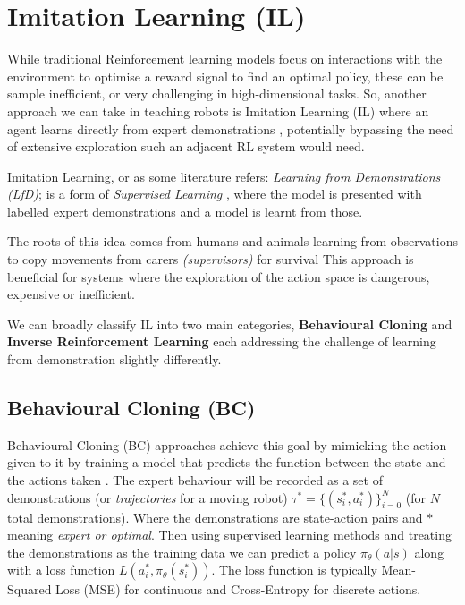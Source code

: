 \section{Imitation Learning (IL)}\label{sec:il}
  While traditional Reinforcement learning models focus on interactions with the environment to optimise a reward signal to find an optimal policy, these can be sample inefficient, or very challenging in high-dimensional tasks. So, another approach we can take in teaching robots is Imitation Learning (IL) where an agent learns directly from expert demonstrations \cite{attia2018globaloverviewimitationlearning}, potentially bypassing the need of extensive exploration such an adjacent RL system would need.

  Imitation Learning, or as some literature refers: \emph{Learning from Demonstrations (LfD)}\cite{ARGALL2009469}; is a form of \emph{Supervised Learning} \cite{hastie2009overview,cunningham2008supervised}, where the model is presented with labelled expert demonstrations and a model is learnt from those.
  
  The roots of this idea comes from humans and animals \cite{bakker1996robot} learning from observations to copy movements from carers \emph{(supervisors)} for survival This approach is beneficial for systems where the exploration of the action space is dangerous, expensive or inefficient.

  We can broadly classify IL into two main categories, \textbf{Behavioural Cloning} and \textbf{Inverse Reinforcement Learning} each addressing the challenge of learning from demonstration slightly differently.


\subsection{Behavioural Cloning (BC)}\label{sec:bc}
 Behavioural Cloning (BC) approaches achieve this goal by  mimicking the action given to it by training a model that predicts the function between the state and the actions taken  \cite{pomerlau1991neco.1991.3.1.88, ross2011reductionimitationlearningstructured}. The expert behaviour will be recorded as a set of demonstrations (or \emph{trajectories} for a moving robot) $\tau^* = \lbrace(s_i^*, a_i^*)\rbrace_{i = 0}^N$ (for $N$ total demonstrations). Where the demonstrations are state-action pairs and \emph{$*$} meaning \emph{expert or optimal}.
 Then using supervised learning methods and treating the demonstrations as the training data we can predict a policy $\pi_\theta\left(a | s\right)$ along with a loss function $L \left( a_i^*, \pi_\theta\left(s_i^*\right) \right)$. The loss function is typically Mean-Squared Loss (MSE) for continuous and Cross-Entropy for discrete actions.

